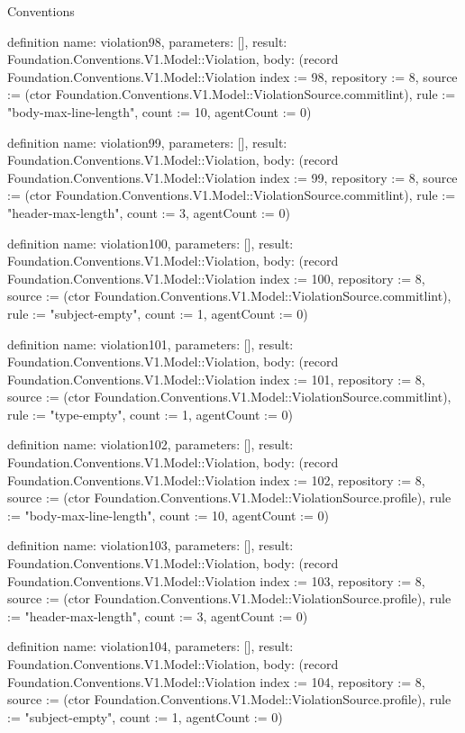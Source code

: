 \begin{lexlean}{Conventions}
\begin{semanticmodule}
definition{
  name: violation98,
  parameters: [],
  result: Foundation.Conventions.V1.Model::Violation,
  body: (record Foundation.Conventions.V1.Model::Violation {index := 98, repository := 8, source := (ctor Foundation.Conventions.V1.Model::ViolationSource.commitlint), rule := "body-max-line-length", count := 10, agentCount := 0})
}

definition{
  name: violation99,
  parameters: [],
  result: Foundation.Conventions.V1.Model::Violation,
  body: (record Foundation.Conventions.V1.Model::Violation {index := 99, repository := 8, source := (ctor Foundation.Conventions.V1.Model::ViolationSource.commitlint), rule := "header-max-length", count := 3, agentCount := 0})
}

definition{
  name: violation100,
  parameters: [],
  result: Foundation.Conventions.V1.Model::Violation,
  body: (record Foundation.Conventions.V1.Model::Violation {index := 100, repository := 8, source := (ctor Foundation.Conventions.V1.Model::ViolationSource.commitlint), rule := "subject-empty", count := 1, agentCount := 0})
}

definition{
  name: violation101,
  parameters: [],
  result: Foundation.Conventions.V1.Model::Violation,
  body: (record Foundation.Conventions.V1.Model::Violation {index := 101, repository := 8, source := (ctor Foundation.Conventions.V1.Model::ViolationSource.commitlint), rule := "type-empty", count := 1, agentCount := 0})
}

definition{
  name: violation102,
  parameters: [],
  result: Foundation.Conventions.V1.Model::Violation,
  body: (record Foundation.Conventions.V1.Model::Violation {index := 102, repository := 8, source := (ctor Foundation.Conventions.V1.Model::ViolationSource.profile), rule := "body-max-line-length", count := 10, agentCount := 0})
}

definition{
  name: violation103,
  parameters: [],
  result: Foundation.Conventions.V1.Model::Violation,
  body: (record Foundation.Conventions.V1.Model::Violation {index := 103, repository := 8, source := (ctor Foundation.Conventions.V1.Model::ViolationSource.profile), rule := "header-max-length", count := 3, agentCount := 0})
}

definition{
  name: violation104,
  parameters: [],
  result: Foundation.Conventions.V1.Model::Violation,
  body: (record Foundation.Conventions.V1.Model::Violation {index := 104, repository := 8, source := (ctor Foundation.Conventions.V1.Model::ViolationSource.profile), rule := "subject-empty", count := 1, agentCount := 0})
}


\end{semanticmodule}
\end{lexlean}
